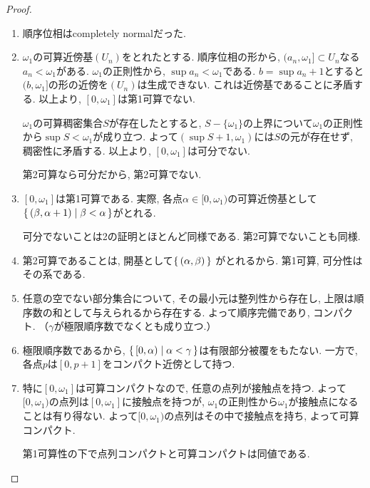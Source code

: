 \documentclass[a4paper, twoside]{bxjsarticle}
\theoremstyle{definition}
\begin{document}
        \begin{proof}
            \begin{enumerate}
                \item 順序位相はcompletely normalだった.
                \item $\omega_1$の可算近傍基$(U_n)$をとれたとする. 順序位相の形から, $(a_n, \omega_1]\subset U_n$なる$a_n<\omega_1$がある. $\omega_1$の正則性から, $\sup a_n <\omega_1$である. $b = \sup a_n+1$とすると$(b, \omega_1]$の形の近傍を$(U_n)$は生成できない. これは近傍基であることに矛盾する. 以上より, $[0, \omega_1]$は第1可算でない.
                
                $\omega_1$の可算稠密集合$S$が存在したとすると, $S-\{\omega_1\}$の上界について$\omega_1$の正則性から$\sup S<\omega_1$が成り立つ. よって$(\sup S+1, \omega_1)$には$S$の元が存在せず, 稠密性に矛盾する. 以上より, $[0, \omega_1]$は可分でない.
                
                第2可算なら可分だから, 第2可算でない.
                \item $[0, \omega_1]$は第1可算である. 実際, 各点$\alpha\in[0, \omega_1)$の可算近傍基として$\set{(\beta, \alpha+1)|\beta<\alpha}$がとれる.
                
                可分でないことは2の証明とほとんど同様である. 第2可算でないことも同様.
                \item 第2可算であることは, 開基として$\set{(\alpha, \beta)}$ がとれるから. 第1可算, 可分性はその系である.
                
                \item 任意の空でない部分集合について, その最小元は整列性から存在し, 上限は順序数の和として与えられるから存在する. よって順序完備であり, コンパクト. （$\gamma$が極限順序数でなくとも成り立つ.）
                
                \item 極限順序数であるから, $\set{[0, \alpha)|\alpha<\gamma}$は有限部分被覆をもたない. 一方で, 各点$p$は$[0, p+1]$をコンパクト近傍として持つ.
                
                \item 特に$[0, \omega_1]$は可算コンパクトなので, 任意の点列が接触点を持つ. よって$[0, \omega_1)$の点列は$[0, \omega_1]$に接触点を持つが, $\omega_1$の正則性から$\omega_1$が接触点になることは有り得ない. よって$[0, \omega_1)$の点列はその中で接触点を持ち, よって可算コンパクト.
                
                第1可算性の下で点列コンパクトと可算コンパクトは同値である.
                

\end{enumerate}
\end{proof}
\end{document}
